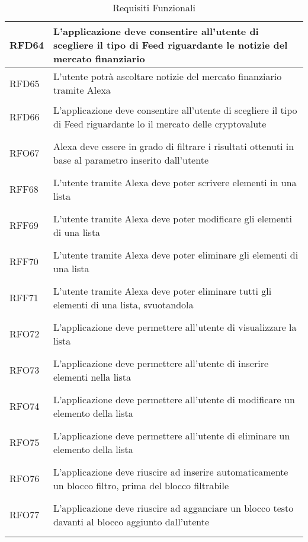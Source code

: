 \begin{longtable}{|>{\centering}m{5em}|m{25em}|}
	\hypertarget{RFD64}{RFD64} & L'applicazione deve consentire all'utente di scegliere il tipo di Feed riguardante le notizie del mercato finanziario\\ \hline
	
	\hypertarget{RFD65}{RFD65} & L'utente potrà ascoltare notizie del mercato finanziario tramite Alexa\\ \hline
	
	\hypertarget{RFD66}{RFD66} & L'applicazione deve consentire all'utente di scegliere il tipo di Feed riguardante lo il mercato delle cryptovalute\\ \hline
	
	\hypertarget{RFO67}{RFO67} & Alexa deve essere in grado di filtrare i risultati ottenuti in base al parametro inserito dall'utente\\ \hline
	
	\hypertarget{RFF68}{RFF68} & L'utente tramite Alexa deve poter scrivere elementi in una lista\\ \hline
	
	\hypertarget{RFF69}{RFF69} & L'utente tramite Alexa deve poter modificare gli elementi di una lista\\ \hline
	
	\hypertarget{RFF70}{RFF70} & L'utente tramite Alexa deve poter eliminare gli elementi di una lista\\ \hline
	
	\hypertarget{RFF71}{RFF71} & L'utente tramite Alexa deve poter eliminare tutti gli elementi di una lista, svuotandola\\ \hline
	
	\hypertarget{RFO72}{RFO72} & L'applicazione deve permettere all'utente di visualizzare la lista\\ \hline
	
	\hypertarget{RFO73}{RFO73} & L'applicazione deve permettere all'utente di inserire elementi nella lista\\ \hline
	
	\hypertarget{RFO74}{RFO74} & L'applicazione deve permettere all'utente di modificare un elemento della lista\\ \hline
	
	\hypertarget{RFO75}{RFO75} & L'applicazione deve permettere all'utente di eliminare un elemento della lista\\ \hline
	
	\hypertarget{RFO76}{RFO76} & L'applicazione deve riuscire ad inserire automaticamente un blocco filtro, prima del blocco filtrabile\\ \hline
	
	\hypertarget{RFO77}{RFO77} & L'applicazione deve riuscire ad agganciare un blocco testo davanti al blocco aggiunto dall'utente\\ \hline
	
	\caption[Requisiti Funzionali]{Requisiti Funzionali}
	\label{tabella:req0}
\end{longtable}
\clearpage
